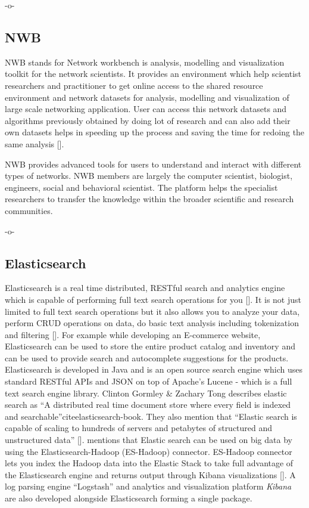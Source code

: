     -o-

\subsection{NWB}

NWB stands for Network workbench is analysis, modelling and
visualization toolkit for the network scientists.  It provides an
environment which help scientist researchers and practitioner to get
online access to the shared resource environment and network datasets
for analysis, modelling and visualization of large scale networking
application.  User can access this network datasets and algorithms
previously obtained by doing lot of research and can also add their
own datasets helps in speeding up the process and saving the time for
redoing the same analysis [\cite{www-nwb.edu}].

NWB provides advanced tools for users to understand and interact with
different types of networks.  NWB members are largely the computer
scientist, biologist, engineers, social and behavioral scientist. The
platform helps the specialist researchers to transfer the knowledge
within the broader scientific and research communities.

    -o-
  
\subsection{Elasticsearch}

Elasticsearch is a real time distributed, RESTful search and analytics
engine which is capable of performing full text search operations for
you [\cite{www-elasticsearch}].  It is not just limited to full text
search operations but it also allows you to analyze your data, perform
CRUD operations on data, do basic text analysis including tokenization
and filtering [\cite{www-elasticsearch-intro}]. For example while
developing an E-commerce website, Elasticsearch can be used to store
the entire product catalog and inventory and can be used to provide
search and autocomplete suggestions for the products. Elasticsearch is
developed in Java and is an open source search engine which uses
standard RESTful APIs and JSON on top of Apache's Lucene - which is a
full text search engine library. Clinton Gormley \& Zachary Tong
describes elastic search as ``A distributed real time document store
where every field is indexed and
searchable''cite{elasticsearch-book}. They also mention that ``Elastic
search is capable of scaling to hundreds of servers and petabytes of
structured and unstructured data''
[\cite{www-elasticsearch-hadoop}]. mentions that Elastic search can be
used on big data by using the Elasticsearch-Hadoop (ES-Hadoop)
connector. ES-Hadoop connector lets you index the Hadoop data into the
Elastic Stack to take full advantage of the Elasticsearch engine and
returns output through Kibana visualizations
[\cite{www-wikipedia-elasticsearch}]. A log parsing engine
``Logstash'' and analytics and visualization platform \textit{Kibana}
are also developed alongside Elasticsearch forming a single package.

